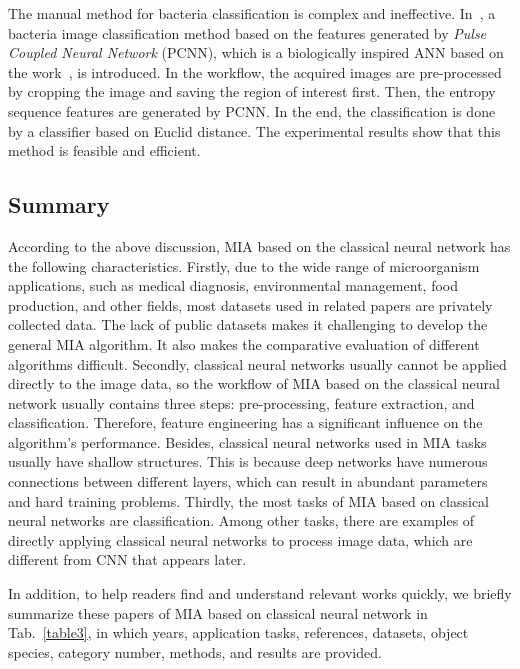 The manual method for bacteria classification is complex and ineffective. In~\cite{Zhu-2010-BCUN}, a bacteria image classification method based on the features generated by \emph{Pulse Coupled Neural Network} (PCNN), which is a biologically inspired ANN based on the work~\cite{Eckhorn-1989-ANNF}, is introduced. In the workflow, the acquired images are pre-processed by cropping the image and saving the region of interest first. Then, the entropy sequence features are generated by PCNN. In the end, the classification is done by a classifier based on Euclid distance. The experimental results show that this method is feasible and efficient.


\subsection{Summary}

According to the above discussion, MIA based on the classical neural network has the following characteristics. Firstly, due to the wide range of microorganism applications, such as medical diagnosis, environmental management, food production, and other fields, most datasets used in related papers are privately collected data. The lack of public datasets makes it challenging to develop the general MIA algorithm. It also makes the comparative evaluation of different algorithms difficult. Secondly, classical neural networks usually cannot be applied directly to the image data, so the workflow of MIA based on the classical neural network usually contains three steps: pre-processing, feature extraction, and classification. Therefore, feature engineering has a significant influence on the algorithm's performance. Besides, classical neural networks used in MIA tasks usually have shallow structures. This is because deep networks have numerous connections between different layers, which can result in abundant parameters and hard training problems. Thirdly, the most tasks of MIA based on classical neural networks are classification. Among other tasks, there are examples of directly applying classical neural networks to process image data, which are different from CNN that appears later.

In addition, to help readers find and understand relevant works quickly, we briefly summarize these papers of MIA based on classical neural network in Tab.~\ref{table3}, in which years, application tasks, references, datasets, object species, category number, methods, and results are provided.




